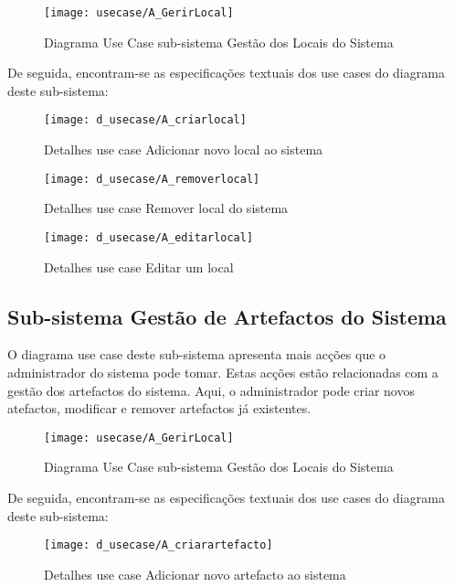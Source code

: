 \documentclass[12pt,a4paper]{article}
\begin{document}
\begin{figure}[h!]
\centering
\texttt{[image: usecase/A\_GerirLocal]}
\label{usecase}
\caption{Diagrama Use Case sub-sistema Gestão dos Locais do Sistema}
\end{figure}

De seguida, encontram-se as especificações textuais dos use cases do diagrama deste sub-sistema:\\

\begin{figure}[h!]
\centering
\texttt{[image: d\_usecase/A\_criarlocal]}
\label{usecase}
\caption{Detalhes use case Adicionar novo local ao sistema}
\end{figure}

\begin{figure}[h!]
\centering
\texttt{[image: d\_usecase/A\_removerlocal]}
\label{usecase}
\caption{Detalhes use case Remover local do sistema}
\end{figure}

\begin{figure}[h!]
\centering
\texttt{[image: d\_usecase/A\_editarlocal]}
\label{usecase}
\caption{Detalhes use case Editar um local}
\end{figure}

\clearpage

\subsection{Sub-sistema Gestão de Artefactos do Sistema}

O diagrama use case deste sub-sistema apresenta mais acções que o administrador do sistema
pode tomar. Estas acções estão relacionadas com a gestão dos artefactos do sistema. Aqui, o
administrador pode criar novos atefactos, modificar e remover artefactos já existentes.\\

\begin{figure}[h!]
\centering
\texttt{[image: usecase/A\_GerirLocal]}
\label{usecase}
\caption{Diagrama Use Case sub-sistema Gestão dos Locais do Sistema}
\end{figure}

De seguida, encontram-se as especificações textuais dos use cases do diagrama deste sub-sistema:\\

\begin{figure}[h!]
\centering
\texttt{[image: d\_usecase/A\_criarartefacto]}
\label{usecase}
\caption{Detalhes use case Adicionar novo artefacto ao sistema}
\end{figure}
\end{document}
